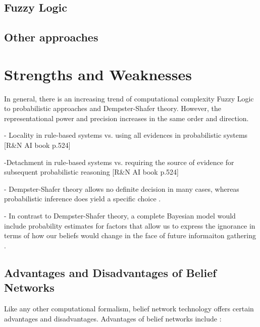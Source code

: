 \documentclass[11pt]{article}
\begin{document}
\subsection{Fuzzy Logic}

\subsection{Other approaches}

\section{Strengths and Weaknesses}

In general, there is an increasing trend of computational complexity Fuzzy Logic
to probabilistic approaches and Dempster-Shafer theory. However, the
representational power and precision increases in the same order and direction.

- Locality in rule-based systems vs. using all evidences in probabilistic
systems [R\&N AI book p.524]

-Detachment in rule-based systems vs. requiring the source of evidence for
subsequent probabilistic reasoning [R\&N AI book p.524]

- Dempster-Shafer theory allows no definite decision in many cases, whereas
probabilistic inference does yield a specific choice \cite{russell:ai-modern}.

- In contrast to Dempster-Shafer theory, a complete Bayesian model would include
probability estimates for factors that allow us to express the ignorance in
terms of how our beliefs would change in the face of future informaiton
gathering \cite{russell:ai-modern}.

\subsection{Advantages and Disadvantages of Belief Networks}

Like any other computational formalism, belief network technology offers certain
advantages and disadvantages. Advantages of belief networks include
\cite{das:decision-making-agents}:
\end{document}
